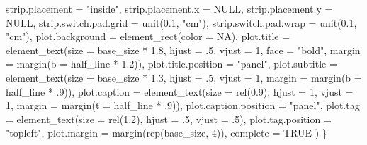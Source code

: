 \documentclass[
  letterpaper,
]{scrbook}
\newenvironment{Shaded}{\begin{snugshade}}{\end{snugshade}}
\newcommand{\AttributeTok}[1]{\textcolor[rgb]{0.40,0.45,0.13}{#1}}
\newcommand{\ConstantTok}[1]{\textcolor[rgb]{0.56,0.35,0.01}{#1}}
\newcommand{\DecValTok}[1]{\textcolor[rgb]{0.68,0.00,0.00}{#1}}
\newcommand{\FloatTok}[1]{\textcolor[rgb]{0.68,0.00,0.00}{#1}}
\newcommand{\FunctionTok}[1]{\textcolor[rgb]{0.28,0.35,0.67}{#1}}
\newcommand{\NormalTok}[1]{\textcolor[rgb]{0.00,0.23,0.31}{#1}}
\newcommand{\SpecialCharTok}[1]{\textcolor[rgb]{0.37,0.37,0.37}{#1}}
\newcommand{\StringTok}[1]{\textcolor[rgb]{0.13,0.47,0.30}{#1}}
\begin{document}
\begin{Shaded}
\begin{Highlighting}[]
    \AttributeTok{strip.placement =} \StringTok{"inside"}\NormalTok{,}
    \AttributeTok{strip.placement.x =} \ConstantTok{NULL}\NormalTok{,}
    \AttributeTok{strip.placement.y =} \ConstantTok{NULL}\NormalTok{,}
    \AttributeTok{strip.switch.pad.grid =} \FunctionTok{unit}\NormalTok{(}\FloatTok{0.1}\NormalTok{, }\StringTok{"cm"}\NormalTok{),}
    \AttributeTok{strip.switch.pad.wrap =} \FunctionTok{unit}\NormalTok{(}\FloatTok{0.1}\NormalTok{, }\StringTok{"cm"}\NormalTok{),}
    \AttributeTok{plot.background =} \FunctionTok{element\_rect}\NormalTok{(}\AttributeTok{color =} \ConstantTok{NA}\NormalTok{),}
    \AttributeTok{plot.title =} \FunctionTok{element\_text}\NormalTok{(}\AttributeTok{size =}\NormalTok{ base\_size }\SpecialCharTok{*} \FloatTok{1.8}\NormalTok{, }\AttributeTok{hjust =}\NormalTok{ .}\DecValTok{5}\NormalTok{,}
                              \AttributeTok{vjust =} \DecValTok{1}\NormalTok{, }\AttributeTok{face =} \StringTok{"bold"}\NormalTok{,}
                              \AttributeTok{margin =} \FunctionTok{margin}\NormalTok{(}\AttributeTok{b =}\NormalTok{ half\_line }\SpecialCharTok{*} \FloatTok{1.2}\NormalTok{)),}
    \AttributeTok{plot.title.position =} \StringTok{"panel"}\NormalTok{,}
    \AttributeTok{plot.subtitle =} \FunctionTok{element\_text}\NormalTok{(}\AttributeTok{size =}\NormalTok{ base\_size }\SpecialCharTok{*} \FloatTok{1.3}\NormalTok{,}
                                 \AttributeTok{hjust =}\NormalTok{ .}\DecValTok{5}\NormalTok{, }\AttributeTok{vjust =} \DecValTok{1}\NormalTok{,}
                                 \AttributeTok{margin =} \FunctionTok{margin}\NormalTok{(}\AttributeTok{b =}\NormalTok{ half\_line }\SpecialCharTok{*}\NormalTok{ .}\DecValTok{9}\NormalTok{)),}
    \AttributeTok{plot.caption =} \FunctionTok{element\_text}\NormalTok{(}\AttributeTok{size =} \FunctionTok{rel}\NormalTok{(}\FloatTok{0.9}\NormalTok{), }\AttributeTok{hjust =} \DecValTok{1}\NormalTok{, }\AttributeTok{vjust =} \DecValTok{1}\NormalTok{,}
                                \AttributeTok{margin =} \FunctionTok{margin}\NormalTok{(}\AttributeTok{t =}\NormalTok{ half\_line }\SpecialCharTok{*}\NormalTok{ .}\DecValTok{9}\NormalTok{)),}
    \AttributeTok{plot.caption.position =} \StringTok{"panel"}\NormalTok{,}
    \AttributeTok{plot.tag =} \FunctionTok{element\_text}\NormalTok{(}\AttributeTok{size =} \FunctionTok{rel}\NormalTok{(}\FloatTok{1.2}\NormalTok{), }\AttributeTok{hjust =}\NormalTok{ .}\DecValTok{5}\NormalTok{, }\AttributeTok{vjust =}\NormalTok{ .}\DecValTok{5}\NormalTok{),}
    \AttributeTok{plot.tag.position =} \StringTok{"topleft"}\NormalTok{,}
    \AttributeTok{plot.margin =} \FunctionTok{margin}\NormalTok{(}\FunctionTok{rep}\NormalTok{(base\_size, }\DecValTok{4}\NormalTok{)),}
    \AttributeTok{complete =} \ConstantTok{TRUE}
\NormalTok{  )}
\NormalTok{\}}
\end{Highlighting}
\end{Shaded}
\end{document}
